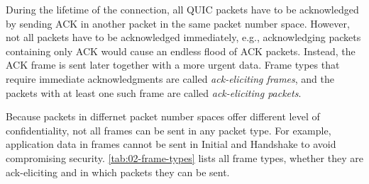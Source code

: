 During the lifetime of the connection, all QUIC packets have to be acknowledged by sending ACK in
another packet in the same packet number space. However, not all packets have to be acknowledged
immediately, e.g., acknowledging packets containing only ACK would cause an endless flood of ACK
packets. Instead, the ACK frame is sent later together with a more urgent data. Frame types that
require immediate acknowledgments are called \textit{ack-eliciting frames}, and the packets with at
least one such frame are called \textit{ack-eliciting packets}.

Because packets in differnet packet number spaces offer different level of confidentiality, not all
frames can be sent in any packet type. For example, application data in \STREAM{} frames cannot be
sent in Initial and Handshake to avoid compromising security. \autoref{tab:02-frame-types} lists all
frame types, whether they are ack-eliciting and in which packets they can be sent.


